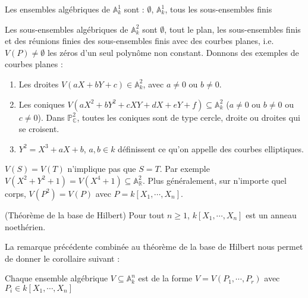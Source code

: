             \begin{exo}
                Les ensembles algébriques de $\mathbb{A}^1_k$ sont : $\emptyset$, $\mathbb{A}_k^1$, tous les sous-ensembles finis 
            \end{exo}
            \begin{expl}
                Les sous-ensembles algébriques de $\mathbb{A}^2_k$ sont $\emptyset$, tout le plan, les sous-ensembles finis et des réunions finies des sous-ensembles finis avec des courbes planes, i.e. $V(P) \neq \emptyset$ les zéros d'un seul polynôme non constant. Donnons des exemples de courbes planes :
                \begin{enumerate}
                    \item Les droites $V(aX + bY + c) \in \mathbb{A}_k^2$, avec $a \neq 0$ ou $b \neq 0$.
                    \item Les coniques $V(aX^2 + bY^2 + cXY + dX + eY + f) \subseteq \mathbb{A}_k^2$ ($a \neq 0$ ou $b \neq 0$ ou $c \neq 0$). Dans $\mathbb{P}_\mathbb{C}^2$, toutes les coniques sont de type cercle, droite ou droites qui se croisent.
                    \item $Y^2 = X^3 + aX + b$, $a,b \in k$ définissent ce qu'on appelle des courbes elliptiques.
                \end{enumerate}
            \end{expl}
            \begin{remq}
                $V(S) = V(T)$ n'implique pas que $S = T$. Par exemple $V(X^2 + Y^2 + 1) = V(X^4 + 1) \subseteq \mathbb{A}_\mathbb{R}^2$. Plus généralement, sur n'importe quel corps, $V(P^2) = V(P)$ avec $P = k[X_1, \cdots, X_n]$.
            \end{remq}
            \begin{theo} (Théorème de la base de Hilbert)
                Pour tout $n \geq 1$, $k[X_1, \cdots, X_n]$ est un anneau noethérien.
            \end{theo}
            La remarque précédente combinée au théorème de la base de Hilbert nous permet de donner le corollaire suivant :
            \begin{coro}
                Chaque ensemble algébrique $V \subseteq \mathbb{A}_k^n$ est de la forme $V = V(P_1, \cdots, P_r)$ avec $P_i \in k[X_1, \cdots, X_n]$
            \end{coro}

